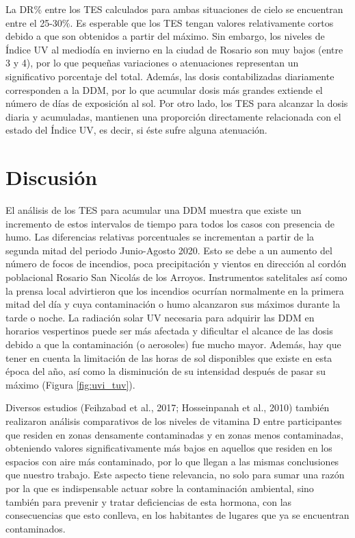 La DR\% entre los TES calculados para ambas situaciones de cielo se encuentran entre el 25-30\%. Es esperable que los TES tengan valores relativamente cortos debido a que son obtenidos a partir del máximo. Sin embargo, los niveles de Índice UV al mediodía en invierno en la ciudad de Rosario son muy bajos (entre 3 y 4),  por lo que pequeñas variaciones o atenuaciones representan un significativo porcentaje del total. Además, las dosis contabilizadas diariamente corresponden a la DDM, por lo que acumular dosis más grandes extiende el número de días de exposición al sol. Por otro lado, los TES para alcanzar la dosis diaria y acumuladas, mantienen una proporción directamente relacionada con el estado del Índice UV, es decir, si éste sufre alguna atenuación.

\section*{Discusión}

El análisis de los TES para acumular una DDM muestra que existe un incremento de estos intervalos de tiempo para todos los casos con presencia de humo. Las diferencias relativas porcentuales se incrementan a partir de la segunda mitad del periodo Junio-Agosto 2020. Esto se debe a un aumento del número de focos de incendios, poca precipitación y vientos en dirección al cordón poblacional Rosario San Nicolás de los Arroyos. Instrumentos satelitales así como la prensa local advirtieron que los incendios ocurrían normalmente en la primera mitad del día y cuya contaminación o humo alcanzaron sus máximos durante la tarde o noche. La radiación solar UV necesaria para adquirir las DDM en horarios vespertinos puede ser más afectada y dificultar el alcance de las dosis debido a que la contaminación (o aerosoles) fue mucho mayor. Además, hay que tener en cuenta la limitación de las horas de sol disponibles que existe en esta época del año, así como la disminución de su intensidad después de pasar su máximo (Figura \ref{fig:uvi_tuv}).

Diversos estudios (Feihzabad et al., 2017; Hosseinpanah et al., 2010) también realizaron análisis comparativos de los niveles de vitamina D entre participantes que residen en zonas densamente contaminadas y en zonas menos contaminadas, obteniendo valores significativamente más bajos en aquellos que residen en los espacios con aire más contaminado, por lo que llegan a las mismas conclusiones que nuestro trabajo. Este aspecto tiene relevancia, no solo para sumar una razón por la que es indispensable actuar sobre la contaminación ambiental, sino también para prevenir y tratar deficiencias de esta hormona, con las consecuencias que esto conlleva, en los habitantes de lugares que ya se encuentran contaminados.

